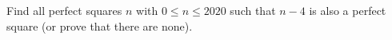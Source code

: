 Find all perfect squares $n$ with $0\le n\le2020$ such that $n-4$ is also a perfect square (or prove that there are none).
